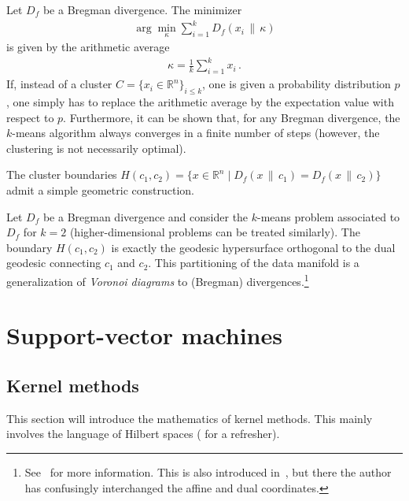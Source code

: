     \begin{property}
        Let $D_f$ be a Bregman divergence. The minimizer
        \begin{gather}
            \arg\min_\kappa\sum_{i=1}^kD_f(x_i\,\|\,\kappa)
        \end{gather}
        is given by the arithmetic average
        \begin{gather}
            \kappa = \frac{1}{k}\sum_{i=1}^kx_i\,.
        \end{gather}
        If, instead of a cluster $C=\{x_i\in\mathbb{R}^n\}_{i\leq k}$, one is given a probability distribution $p$, one simply has to replace the arithmetic average by the expectation value with respect to $p$. Furthermore, it can be shown that, for any Bregman divergence, the $k$-means algorithm always converges in a finite number of steps (however, the clustering is not necessarily optimal).
    \end{property}

    The cluster boundaries $H(c_1, c_2)=\{x\in\mathbb{R}^n\mid D_f(x\,\|\,c_1)=D_f(x\,\|\,c_2)\}$ admit a simple geometric construction.
    \begin{property}
        Let $D_f$ be a Bregman divergence and consider the $k$-means problem associated to $D_f$ for $k=2$ (higher-dimensional problems can be treated similarly). The boundary $H(c_1,c_2)$ is exactly the geodesic hypersurface orthogonal to the dual geodesic connecting $c_1$ and $c_2$. This partitioning of the data manifold is a generalization of \textit{Voronoi diagrams} to (Bregman) divergences.\footnote{See~\citet{boissonnat_bregman_2010} for more information. This is also introduced in~\citet{amari_information_2016}, but there the author has confusingly interchanged the affine and dual coordinates.}
    \end{property}

\section{Support-vector machines}
\subsection{Kernel methods}\label{data:kernel_methods}

    This section will introduce the mathematics of kernel methods. This mainly involves the language of Hilbert spaces ( for a refresher).

